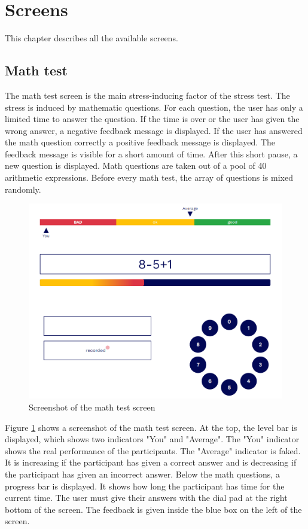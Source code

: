 \section{Screens}
\label{sec:screens}

This chapter describes all the available screens.

\subsection{Math test}
\label{sec:screens-math-test}

The math test screen is the main stress-inducing factor of the stress test.
The stress is induced by mathematic questions. 
For each question, the user has only a limited time to answer the question. 
If the time is over or the user has given the wrong answer, a negative feedback message is displayed. 
If the user has answered the math question correctly a positive feedback message is displayed. 
The feedback message is visible for a short amount of time. 
After this short pause, a new question is displayed.
Math questions are taken out of a pool of 40 arithmetic expressions. 
Before every math test, the array of questions is mixed randomly.

\begin{figure}[htb]
  \centering
  \includegraphics[width=\textwidth]{figures/Math-test.png}
  \caption{Screenshot of the math test screen}
  \label{fig:screenshot-math-test-screen}
\end{figure}

Figure \ref{fig:screenshot-math-test-screen} shows a screenshot of the math test screen.
At the top, the level bar is displayed, which shows two indicators "You" and "Average".
The "You" indicator shows the real performance of the participants.
The "Average" indicator is faked.
It is increasing if the participant has given a correct answer and is decreasing if the participant has given an incorrect answer.
Below the math questions, a progress bar is displayed.
It shows how long the participant has time for the current time.
The user must give their answers with the dial pad at the right bottom of the screen.
The feedback is given inside the blue box on the left of the screen.

